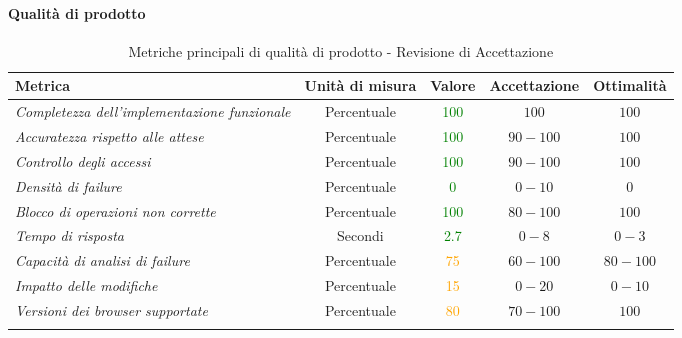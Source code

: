 \paragraph{Qualità di prodotto}
\begin{longtable}{|>{\centering}m{5cm}|c|c|c|c|}
\hline
\textbf{Metrica} & \textbf{Unità di misura} & \textbf{Valore} & \textbf{Accettazione} & \textbf{Ottimalità}\\
\hline
\endhead
\emph{Completezza dell'implementazione funzionale} & {Percentuale} & \textcolor{Green}{100} & $100$ & $100$\\ \hline
\emph{Accuratezza rispetto alle attese} & {Percentuale} & \textcolor{Green}{100} & $90 - 100$ & $100$\\ \hline
\emph{Controllo degli accessi} & {Percentuale} & \textcolor{Green}{100} & $90 - 100$ & $100$\\ \hline
\emph{Densità di failure} & {Percentuale} & \textcolor{Green}{0} & $0 - 10$  & $0$\\ \hline
\emph{Blocco di operazioni non corrette} & {Percentuale} & \textcolor{Green}{100} & $80 - 100$  & $100$\\ \hline
\emph{Tempo di risposta} & {Secondi} & \textcolor{Green}{2.7} & $0 - 8$ & $0 - 3$\\ \hline
\emph{Capacità di analisi di failure} & {Percentuale} & \textcolor{Orange}{75} & $60 - 100$ & $80 - 100$\\ \hline
\emph{Impatto delle modifiche} & {Percentuale} & \textcolor{Orange}{15} & $0 - 20$ & $0 - 10$\\ \hline
\emph{Versioni dei browser supportate} & {Percentuale} & \textcolor{Orange}{80} & $70 - 100$ & $100$\\ \hline
\caption{Metriche principali di qualità di prodotto - Revisione di Accettazione}
\end{longtable}